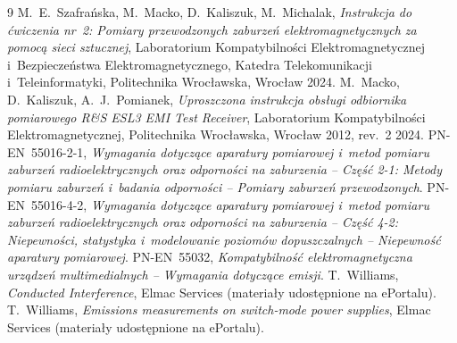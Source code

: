 \documentclass[11pt,a4paper]{article}
\begin{document}
{\small
\begin{thebibliography}{9}
\setlength{\itemsep}{1pt}
 M.~E.~Szafrańska, M.~Macko, D.~Kaliszuk, M.~Michalak, \emph{Instrukcja do
  ćwiczenia nr~2: Pomiary przewodzonych zaburzeń elektromagnetycznych za pomocą sieci
  sztucznej}, Laboratorium Kompatybilności Elektromagnetycznej i~Bezpieczeństwa
  Elektromagnetycznego, Katedra Telekomunikacji i~Teleinformatyki, Politechnika Wrocławska,
  Wrocław 2024.
 M.~Macko, D.~Kaliszuk, A.~J.~Pomianek, \emph{Uproszczona instrukcja obsługi
  odbiornika pomiarowego R\&S ESL3 EMI Test Receiver}, Laboratorium Kompatybilności
  Elektromagnetycznej, Politechnika Wrocławska, Wrocław 2012, rev.~2 2024.
 PN-EN~55016-2-1, \emph{Wymagania dotyczące aparatury pomiarowej i~metod
  pomiaru zaburzeń radioelektrycznych oraz odporności na zaburzenia -- Część 2-1: Metody
  pomiaru zaburzeń i~badania odporności -- Pomiary zaburzeń przewodzonych}.
 PN-EN~55016-4-2, \emph{Wymagania dotyczące aparatury pomiarowej i~metod
  pomiaru zaburzeń radioelektrycznych oraz odporności na zaburzenia -- Część 4-2:
  Niepewności, statystyka i~modelowanie poziomów dopuszczalnych -- Niepewność aparatury
  pomiarowej}.
 PN-EN~55032, \emph{Kompatybilność elektromagnetyczna urządzeń
  multimedialnych -- Wymagania dotyczące emisji}.
 T.~Williams, \emph{Conducted Interference}, Elmac Services (materiały
  udostępnione na ePortalu).
 T.~Williams, \emph{Emissions measurements on switch-mode power supplies},
  Elmac Services (materiały udostępnione na ePortalu).
\end{thebibliography}
}
\end{document}
